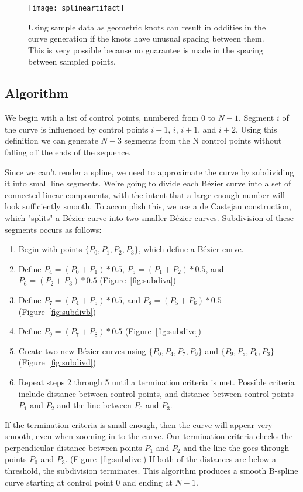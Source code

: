 \begin{figure}
\begin{center}
\texttt{[image: splineartifact]}
\end{center}
\caption[An artifact in spline generation caused by oddly spaced sample points]{Using sample data as geometric knots can result in oddities in the curve generation if the knots have unusual spacing between them. This is very possible because no guarantee is made in the spacing between sampled points.}
\label{fig:splineartifact}
\end{figure}

\subsection{Algorithm}

We begin with a list of control points, numbered from 0 to $N-1$. 
Segment $i$ of the curve is influenced by control points $i-1$, $i$, $i+1$, and $i+2$.
Using this definition we can generate $N-3$ segments from the N control points without falling off the ends of the sequence.

Since we can't render a spline, we need to approximate the curve by subdividing it into small line segments.
We're going to divide each B\'{e}zier curve into a set of connected linear components, with the intent that a large enough number will look sufficiently smooth.
To accomplish this, we use a de Castejau construction, which "splits" a B\'{e}zier curve into two smaller B\'{e}zier curves.
Subdivision of these segments occurs as follows:
\begin{enumerate}
\item Begin with points $\{P_0,P_1,P_2,P_3\}$, which define a B\'{e}zier curve.
\item Define $P_4=(P_0 + P_1)*0.5$, $P_5=(P_1 + P_2)*0.5$, and $P_6=(P_2 + P_3)*0.5$ (Figure~\ref{fig:subdiva})
\item Define $P_7=(P_4 + P_5)*0.5$, and $P_8=(P_5 + P_6)*0.5$ (Figure~\ref{fig:subdivb})
\item Define $P_9=(P_7 + P_8)*0.5$ (Figure~\ref{fig:subdivc})
\item Create two new B\'{e}zier curves using $\{P_0,P_4,P_7,P_9\}$ and $\{P_9,P_8,P_6,P_3\}$ (Figure~\ref{fig:subdivd})
\item Repeat steps 2 through 5 until a termination criteria is met. Possible criteria include distance between control points, and distance between control points $P_1$ and $P_2$ and the line between $P_0$ and $P_3$.
\end{enumerate}
If the termination criteria is small enough, then the curve will appear very smooth, even when zooming in to the curve.
Our termination criteria checks the perpendicular distance between points $P_1$ and $P_2$ and the line the goes through points $P_0$ and $P_3$. (Figure~\ref{fig:subdive})
If both of the distances are below a threshold, the subdivision terminates.
This algorithm produces a smooth B-spline curve starting at control point 0 and ending at $N-1$.

